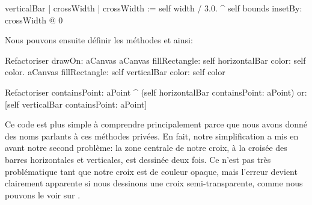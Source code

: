 \documentclass[a4paper,10pt,twoside]{book}
\begin{document}
\begin{method}{}
verticalBar
	| crossWidth |
	crossWidth := self width / 3.0.
	^ self bounds insetBy: crossWidth @ 0
\end{method}

\noindent
Nous pouvons ensuite d\'efinir les m\'ethodes  et
 ainsi:

\begin{method}{Refactoriser }
drawOn: aCanvas 
	aCanvas fillRectangle: self horizontalBar color: self color.
	aCanvas fillRectangle: self verticalBar color: self color
\end{method}

\begin{method}{Refactoriser }
containsPoint: aPoint
	^ (self horizontalBar containsPoint: aPoint)
		or: [self verticalBar containsPoint: aPoint]
\end{method}

Ce code est plus simple \`a comprendre principalement parce que nous
avons donn\'e des noms parlants \`a ces m\'ethodes priv\'ees. En fait,
notre simplification a mis en avant notre second probl\`eme: 
la zone centrale de notre croix, \`a la crois\'ee des barres
horizontales et verticales, est dessin\'ee deux fois. Ce n'est pas
tr\`es probl\'ematique tant que notre croix est de couleur opaque,
mais l'erreur devient clairement apparente si nous dessinons une croix
semi-transparente, comme nous pouvons le voir sur .
\end{document}
